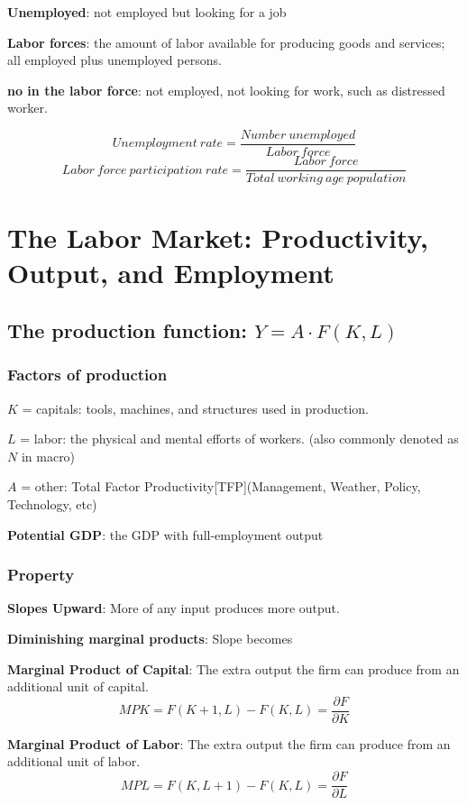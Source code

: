 \documentclass[10pt, a4paper]{article}
\begin{document}
            \textbf{Unemployed}: not employed but looking for a job 
            
            \textbf{Labor forces}: the amount of labor available for producing goods 
            and services; all employed plus unemployed persons. 
            
            \textbf{no in the labor force}: not employed, not looking for work, such as distressed worker. 

            $$Unemployment\ rate = \frac{Number\ unemployed}{Labor\ force}$$
            $$Labor\ force\ participation\ rate = \frac{Labor\ force}{Total\ working\ age\ population}$$
    
    \section{The Labor Market: Productivity, Output, and Employment}
        \subsection{The production function: $Y = A\cdot F(K, L)$}
        \subsubsection{Factors of production}
            $K$ = capitals: tools, machines, and structures used in production.
            
            $L$ = labor: the physical and mental efforts of workers. (also commonly denoted as $N$ in macro) 

            $A$ = other: Total Factor Productivity[TFP](Management, Weather, Policy, Technology, etc)
            
            \textbf{Potential GDP}: the GDP with full-employment output
        \subsubsection{Property}
            \textbf{Slopes Upward}: More of any input produces more output. 
            
            \textbf{Diminishing marginal products}: Slope becomes 
            
            \textbf{Marginal Product of Capital}: The extra output the firm can produce from an additional unit of capital. 
            $$MPK = F(K + 1, L) - F(K, L)  = \frac{\partial F}{\partial K}$$
            
            \textbf{Marginal Product of Labor}: The extra output the firm can produce from an additional unit of labor.  
            $$MPL = F(K, L + 1) - F(K, L) = \frac{\partial F}{\partial L}$$
\end{document}
